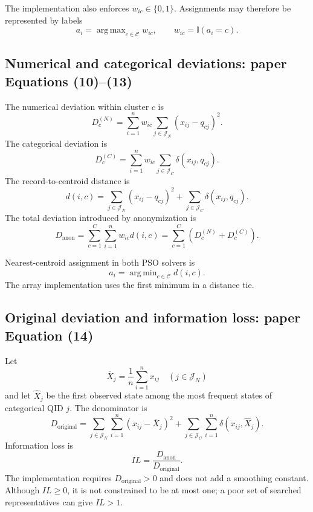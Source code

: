\documentclass[11pt,a4paper]{article}
\newcommand{\I}{\mathbb{I}}
\DeclareMathOperator*{\argmin}{arg\,min}
\DeclareMathOperator*{\argmax}{arg\,max}
\begin{document}
The implementation also enforces $w_{ic}\in\{0,1\}$.  Assignments may
therefore be represented by labels
\[
a_i=\argmax_{c\in\mathcal C}w_{ic},
\qquad w_{ic}=\I(a_i=c).
\tag{6}
\]

\subsection{Numerical and categorical deviations: paper Equations (10)--(13)}

The numerical deviation within cluster $c$ is
\begin{equation}
D^{(N)}_c=
\sum_{i=1}^{n}w_{ic}\sum_{j\in\mathcal J_N}(x_{ij}-q_{cj})^2.
\tag{P10}
\end{equation}
The categorical deviation is
\begin{equation}
D^{(C)}_c=
\sum_{i=1}^{n}w_{ic}\sum_{j\in\mathcal J_C}\delta(x_{ij},q_{cj}).
\tag{P11}
\end{equation}
The record-to-centroid distance is
\begin{equation}
d(i,c)=
\sum_{j\in\mathcal J_N}(x_{ij}-q_{cj})^2
+\sum_{j\in\mathcal J_C}\delta(x_{ij},q_{cj}).
\tag{P12}
\end{equation}
The total deviation introduced by anonymization is
\begin{equation}
D_{\mathrm{anon}}
=\sum_{c=1}^{C}\sum_{i=1}^{n}w_{ic}d(i,c)
=\sum_{c=1}^{C}\left(D^{(N)}_c+D^{(C)}_c\right).
\tag{P13}
\end{equation}

Nearest-centroid assignment in both PSO solvers is
\[
a_i=\argmin_{c\in\mathcal C}d(i,c).
\tag{7}
\]
The array implementation uses the first minimum in a distance tie.

\subsection{Original deviation and information loss: paper Equation (14)}

Let
\[
\overline X_j=\frac1n\sum_{i=1}^{n}x_{ij}
\quad(j\in\mathcal J_N)
\]
and let $\widehat X_j$ be the first observed state among the most frequent
states of categorical QID $j$.  The denominator is
\begin{equation}
D_{\mathrm{original}}=
\sum_{j\in\mathcal J_N}\sum_{i=1}^{n}(x_{ij}-\overline X_j)^2
+\sum_{j\in\mathcal J_C}\sum_{i=1}^{n}
\delta(x_{ij},\widehat X_j).
\tag{P14}
\end{equation}
Information loss is
\begin{equation}
IL=\frac{D_{\mathrm{anon}}}{D_{\mathrm{original}}}.
\tag{IL}
\end{equation}
The implementation requires $D_{\mathrm{original}}>0$ and does not add a
smoothing constant.  Although $IL\ge0$, it is not constrained to be at most
one; a poor set of searched representatives can give $IL>1$.
\end{document}

